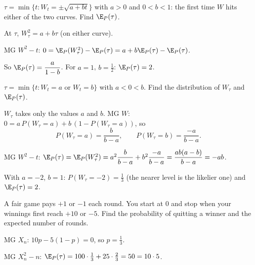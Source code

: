 \begin{problem}
$\tau=\min\{t:W_t=\pm\sqrt{a+bt}\}$ with $a>0$ and $0<b<1$: the first time $W$ hits either of the two curves. Find $\E_P(\tau)$.
\begin{steps}
  \item At $\tau$, $W_\tau^2=a+b\tau$ (on either curve).
  \item MG $W^2-t$: $0=\E_P(W_\tau^2)-\E_P(\tau)=a+b\E_P(\tau)-\E_P(\tau)$.
  \item So $\E_P(\tau)=\dfrac{a}{1-b}$. For $a=1$, $b=\frac12$: $\E_P(\tau)=2$.
\end{steps}
\end{problem}

\begin{pic}
\end{pic}

\begin{problem}
$\tau=\min\{t:W_t=a\text{ or }W_t=b\}$ with $a<0<b$. Find the distribution of $W_\tau$ and $\E_P(\tau)$.
\begin{steps}
  \item $W_\tau$ takes only the values $a$ and $b$. MG $W$: $0=a\,P(W_\tau=a)+b\,(1-P(W_\tau=a))$, so
  \[
    P(W_\tau=a)=\frac{b}{b-a},\qquad P(W_\tau=b)=\frac{-a}{b-a}.
  \]
  \item MG $W^2-t$: $\E_P(\tau)=\E_P(W_\tau^2)=a^2\dfrac{b}{b-a}+b^2\dfrac{-a}{b-a}=\dfrac{ab(a-b)}{b-a}=-ab$.
\end{steps}
With $a=-2$, $b=1$: $P(W_\tau=-2)=\frac13$ (the nearer level is the likelier one) and $\E_P(\tau)=2$.
\end{problem}

\begin{problem}
A fair game pays $+1$ or $-1$ each round. You start at $0$ and stop when your winnings first reach $+10$ or $-5$. Find the probability of quitting a winner and the expected number of rounds.
\begin{steps}
  \item MG $X_n$: $10p-5(1-p)=0$, so $p=\frac13$.
  \item MG $X_n^2-n$: $\E_P(\tau)=100\cdot\frac13+25\cdot\frac23=50=10\cdot5$.
\end{steps}
\end{problem}


